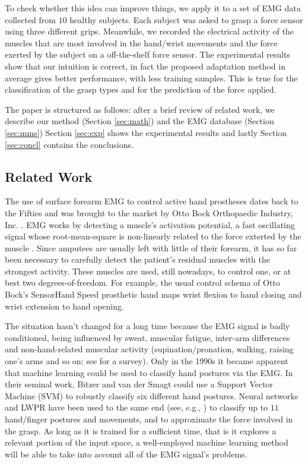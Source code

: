 To check whether this idea can improve things, we apply it to a set of
EMG data collected from $10$ healthy subjects. Each subject was asked
to grasp a force sensor 
using three
different grips. Meanwhile, we recorded the electrical activity of the
muscles that are most involved in the hand/wrist movements and the
force exerted by the subject on a off-the-shelf force sensor. The
experimental results show that our intuition is correct, in fact the
proposed adaptation method in average gives better performance, with
less training samples. This is true for the classification of the grasp
types and for the prediction of the force applied. 

The paper is structured as follows: after a brief review of related
work, 
we describe our method (Section \ref{sec:math}) and the EMG database
(Section \ref{sec:mms}) %
Section \ref{sec:exp}
shows the experimental results and lastly Section \ref{sec:concl}
contains the conclusions.

\subsection{Related Work}

The use of surface forearm EMG to control active hand prostheses dates
back to the Fifties and was brought to the market by Otto Bock
Orthopaedic Industry, Inc. \cite{history}. EMG works by detecting a
muscle's activation potential, a fast oscillating signal whose
root-mean-square is non-linearly related to the force exterted by the
muscle \cite{deluca}. Since amputees are usually left with little of
their forearm, it has so far been necessary to carefully detect the
patient's residual muscles with the strongest activity. These muscles
are used, still nowadays, to control one, or at best two
degrees-of-freedom. For example, the usual control schema of Otto
Bock's SensorHand Speed prosthetic hand maps wrist flexion to hand
closing and wrist extension to hand opening.

The situation hasn't changed for a long time because the EMG signal is
badly conditioned, being influenced by sweat, muscular fatigue,
inter-arm differences and non-hand-related muscular activity
(supination/pronation, walking, raising one's arms and so on; see
\cite{zecca} for a survey). Only in the 1990s it became apparent that
machine learning could be used to classify hand postures via the
EMG. In their seminal work, Bitzer and van der Smagt \cite{smagt}
could use a Support Vector Machine (SVM) to robustly classify six different
hand postures. Neural networks and LWPR \cite{lwpr} have been used to
the same end (see, e.g., \cite{2008.ICRA,2008.BioCyb,Sebelius2005}) to
classify up to $11$ hand/finger postures and movements, and to
approximate the force involved in the grasp. As long as it is trained
for a sufficient time, that is it explores a relevant portion of the
input space, a well-employed machine learning method will be able to
take into account all of the EMG signal's problems.

